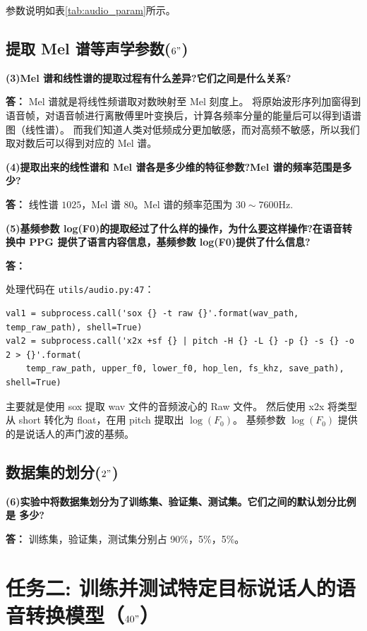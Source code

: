 \documentclass[degree=project,degree-type=project,cjk-font=noto]{thuthesis}
\begin{document}
参数说明如表\ref{tab:audio_param}所示。

\section{提取 Mel 谱等声学参数($6"$)}

\textbf{(3)Mel 谱和线性谱的提取过程有什么差异?它们之间是什么关系?}

\textbf{答：} Mel 谱就是将线性频谱取对数映射至 Mel 刻度上。
将原始波形序列加窗得到语音帧，对语音帧进行离散傅里叶变换后，计算各频率分量的能量后可以得到语谱图（线性谱）。
而我们知道人类对低频成分更加敏感，而对高频不敏感，所以我们取对数后可以得到对应的 Mel 谱。

\textbf{(4)提取出来的线性谱和 Mel 谱各是多少维的特征参数?Mel 谱的频率范围是多少?}

\textbf{答：}
线性谱 $1025$，Mel 谱 $80$。Mel 谱的频率范围为 $30 \sim 7600$Hz.

\textbf{(5)基频参数 log(F0)的提取经过了什么样的操作，为什么要这样操作?在语音转换中 PPG 提供了语言内容信息，基频参数 log(F0)提供了什么信息?}

\textbf{答：}

处理代码在 \texttt{utils/audio.py:47}：
  \begin{verbatim}
val1 = subprocess.call('sox {} -t raw {}'.format(wav_path, temp_raw_path), shell=True)
val2 = subprocess.call('x2x +sf {} | pitch -H {} -L {} -p {} -s {} -o 2 > {}'.format(
	temp_raw_path, upper_f0, lower_f0, hop_len, fs_khz, save_path), shell=True)
  \end{verbatim}

主要就是使用 sox 提取 wav 文件的音频波心的 Raw 文件。
然后使用 x2x 将类型从 short 转化为 float，在用 pitch 提取出 $\log(F_0)$。
基频参数 $\log(F_0)$ 提供的是说话人的声门波的基频。

\section{数据集的划分($2"$)}

\textbf{(6)实验中将数据集划分为了训练集、验证集、测试集。它们之间的默认划分比例是 多少?}

\textbf{答：}
训练集，验证集，测试集分别占 90\%，5\%，5\%。

\chapter{任务二: 训练并测试特定目标说话人的语音转换模型（$40"$）}
\end{document}
